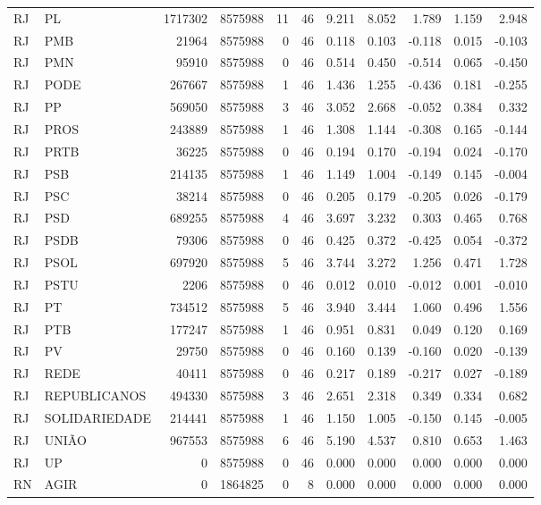 \begin{landscape}
\begin{longtable}{llrrrrrrrrr}
RJ & PL & 1717302 & 8575988 & 11 & 46 & 9.211 & 8.052 & 1.789 & 1.159 & 2.948 \\
RJ & PMB & 21964 & 8575988 & 0 & 46 & 0.118 & 0.103 & -0.118 & 0.015 & -0.103 \\
RJ & PMN & 95910 & 8575988 & 0 & 46 & 0.514 & 0.450 & -0.514 & 0.065 & -0.450 \\
RJ & PODE & 267667 & 8575988 & 1 & 46 & 1.436 & 1.255 & -0.436 & 0.181 & -0.255 \\
RJ & PP & 569050 & 8575988 & 3 & 46 & 3.052 & 2.668 & -0.052 & 0.384 & 0.332 \\
RJ & PROS & 243889 & 8575988 & 1 & 46 & 1.308 & 1.144 & -0.308 & 0.165 & -0.144 \\
RJ & PRTB & 36225 & 8575988 & 0 & 46 & 0.194 & 0.170 & -0.194 & 0.024 & -0.170 \\
RJ & PSB & 214135 & 8575988 & 1 & 46 & 1.149 & 1.004 & -0.149 & 0.145 & -0.004 \\
RJ & PSC & 38214 & 8575988 & 0 & 46 & 0.205 & 0.179 & -0.205 & 0.026 & -0.179 \\
RJ & PSD & 689255 & 8575988 & 4 & 46 & 3.697 & 3.232 & 0.303 & 0.465 & 0.768 \\
RJ & PSDB & 79306 & 8575988 & 0 & 46 & 0.425 & 0.372 & -0.425 & 0.054 & -0.372 \\
RJ & PSOL & 697920 & 8575988 & 5 & 46 & 3.744 & 3.272 & 1.256 & 0.471 & 1.728 \\
RJ & PSTU & 2206 & 8575988 & 0 & 46 & 0.012 & 0.010 & -0.012 & 0.001 & -0.010 \\
RJ & PT & 734512 & 8575988 & 5 & 46 & 3.940 & 3.444 & 1.060 & 0.496 & 1.556 \\
RJ & PTB & 177247 & 8575988 & 1 & 46 & 0.951 & 0.831 & 0.049 & 0.120 & 0.169 \\
RJ & PV & 29750 & 8575988 & 0 & 46 & 0.160 & 0.139 & -0.160 & 0.020 & -0.139 \\
RJ & REDE & 40411 & 8575988 & 0 & 46 & 0.217 & 0.189 & -0.217 & 0.027 & -0.189 \\
RJ & REPUBLICANOS & 494330 & 8575988 & 3 & 46 & 2.651 & 2.318 & 0.349 & 0.334 & 0.682 \\
RJ & SOLIDARIEDADE & 214441 & 8575988 & 1 & 46 & 1.150 & 1.005 & -0.150 & 0.145 & -0.005 \\
RJ & UNIÃO & 967553 & 8575988 & 6 & 46 & 5.190 & 4.537 & 0.810 & 0.653 & 1.463 \\
RJ & UP & 0 & 8575988 & 0 & 46 & 0.000 & 0.000 & 0.000 & 0.000 & 0.000 \\
RN & AGIR & 0 & 1864825 & 0 & 8 & 0.000 & 0.000 & 0.000 & 0.000 & 0.000 \\

\end{longtable}
\end{landscape}

